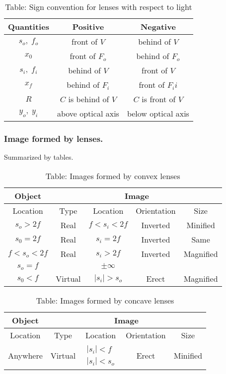 \documentclass[../../../main.tex]{subfiles}
\begin{document}
\begin{table}
    \centering
    \caption*{Table: Sign convention for lenses with respect to light}
    \begin{tabular}{c c c}
        \toprule
        Quantities & Positive & Negative\\ 
        \midrule
        $s_o,\;f_o$& front of $V $ & behind of $V $ \\ 
        $x_0$& front of $F_o $ & behind of $F_o $\\
        $s_i,\;f_i$& behind of $V $ & front of $V $\\
        $x_f$& behind of $F_i $ & front of $F_ii $\\
        $R$& $C$ is behind of $V $ & $C$ is front of $V $\\
        $y_o,\;y_i$& above optical axis &below optical axis\\
        \bottomrule        
    \end{tabular}
\end{table}

\subsubsection{Image formed by lenses.} Summarized by tables.
\begin{table}
    \centering
    \caption*{Table: Images formed by convex lenses}
    \begin{tabular}{ccccc}
        \toprule
        Object & \multicolumn{4}{c}{Image}\\
        \midrule
        Location & Type & Location & Orientation & Size\\
        \midrule
        $s_o>2f$ &Real &$f<s_i<2f$ &Inverted &Minified \\
        $s_0=2f$ &Real &$s_i=2f$ &Inverted &Same \\
        $f<s_o<2f$ &Real &$s_i>2f$ &Inverted &Magnified \\
        $s_o=f$ & &$\pm \infty$ & & \\
        $s_0<f$ &Virtual &$|s_i|>s_o$ &Erect &Magnified \\
        \bottomrule
    \end{tabular}
\end{table}

\begin{table}
    \centering
    \caption*{Table: Images formed by concave lenses}
    \begin{tabular}{ccccc}
        \toprule
        Object & \multicolumn{4}{c}{Image}\\
        \midrule
        Location & Type & Location & Orientation & Size\\
        \midrule
        Anywhere &Virtual &$\begin{matrix}|s_i|<f \\|s_i|<s_o\end{matrix}$ &Erect &Minified \\
        \bottomrule
    \end{tabular}
\end{table}
\end{document}
